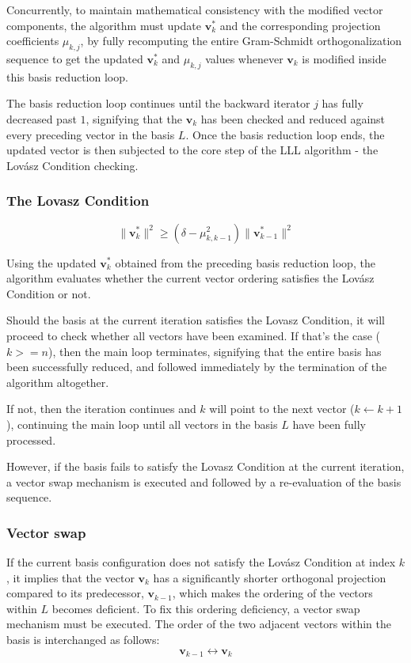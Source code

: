 \documentclass[runningheads]{llncs}
\begin{document}
Concurrently, to maintain mathematical consistency with the modified vector components, the algorithm must update $\mathbf{v}_k^*$ and the corresponding projection coefficients $\mu_{k,j}$, by fully recomputing the entire Gram-Schmidt orthogonalization sequence to get the updated $\mathbf{v}_k^*$ and $\mu_{k,j}$ values whenever $\mathbf{v}_k$ is modified inside this basis reduction loop.

The basis reduction loop continues until the backward iterator $j$ has fully decreased past $1$, signifying that the $\mathbf{v}_k$ has been checked and reduced against every preceding vector in the basis $L$.
Once the basis reduction loop ends, the updated vector is then subjected to the core step of the LLL algorithm - the Lovász Condition checking.

\subsubsection{The Lovasz Condition}
\mbox{}
$$\|\mathbf{v}_k^*\|^2 \ge \left(\delta - \mu_{k,k-1}^2\right)\|\mathbf{v}_{k-1}^*\|^2$$

Using the updated $\mathbf{v}_k^*$ obtained from the preceding basis reduction loop, the algorithm evaluates whether the current vector ordering satisfies the Lovász Condition or not. 

Should the basis at the current iteration satisfies the Lovasz Condition, it will proceed to check whether all vectors have been examined. If that's the case ($k >= n$), then the main loop terminates, signifying that the entire basis has been successfully reduced, and followed immediately by the termination of the algorithm altogether. 

If not, then the iteration continues and $k$ will point to the next vector ($k \leftarrow k + 1$), continuing the main loop until all vectors in the basis $L$ have been fully processed. 

However, if the basis fails to satisfy the Lovasz Condition at the current iteration, a vector swap mechanism is executed and followed by a re-evaluation of the basis sequence. 

\subsubsection{Vector swap}
\mbox{}
If the current basis configuration does not satisfy the Lovász Condition at index $k$, it implies that the vector $\mathbf{v}_k$ has a significantly shorter orthogonal projection compared to its predecessor, $\mathbf{v}_{k-1}$, which makes the ordering of the vectors within $L$ becomes deficient. To fix this ordering deficiency, a vector swap mechanism must be executed. The order of the two adjacent vectors within the basis is interchanged as follows:
\begin{equation}
    \mathbf{v}_{k-1} \leftrightarrow \mathbf{v}_k
\end{equation}
\end{document}
